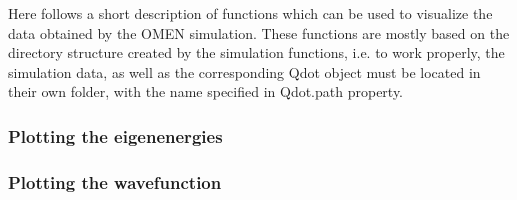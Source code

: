 Here follows a short description of functions which can be used to visualize the data obtained by the OMEN simulation.
These functions are mostly based on the directory structure created by the simulation functions, i.e. to work properly, the simulation data, as well as the corresponding Qdot object must be located in their own folder, with the name specified in Qdot.path property.

\subsubsection{Plotting the eigenenergies}
\subsubsection{Plotting the wavefunction}

